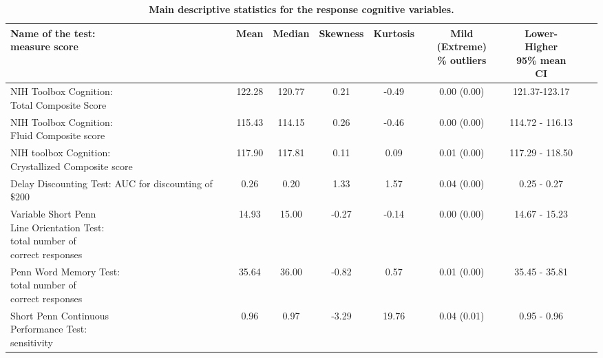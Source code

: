 \documentclass[10pt,letterpaper]{article}
\begin{document}
\begin{table}[!ht]
\begin{adjustwidth}{-2.25in}{0in} 
\centering
\caption{{\bf Main descriptive statistics for the response cognitive variables.}}
\begin{tabular}{|l|c|c|c|c|c|c|c|c|}
\hline
\makecell[l]{Name of the test:\\ measure score} &    Mean &  Median &  Skewness &  Kurtosis &    \makecell{Mild (Extreme) \\ \%  outliers} &\makecell{Lower-Higher \\ 95\% mean CI} \\
\hline
\makecell[l]{NIH Toolbox Cognition: \\ Total  Composite Score}   &  122.28 &  120.77 &      0.21 &     -0.49 &             0.00 (0.00) &  121.37-123.17 \\
\hline
\makecell[l]{NIH Toolbox Cognition: \\ Fluid  Composite score}  &  115.43 &  114.15 &      0.26 &     -0.46 &             0.00 (0.00)  &  114.72 -   116.13 \\
\hline
\makecell[l]{NIH toolbox  Cognition: \\ Crystallized Composite score} &  117.90 &  117.81 &      0.11 &      0.09 &             0.01 (0.00) &      117.29 -   118.50 \\
\hline
\makecell[l]{Delay Discounting Test:\\ AUC for discounting \\ of $\$200$ }      &    0.26 &    0.20 &      1.33 &      1.57 &             0.04 (0.00) &     0.25 - 0.27 \\
 \hline
 \makecell[l]{Variable Short Penn \\ Line  Orientation Test: \\ total number of \\ correct responses} &   14.93 &   15.00 &     -0.27 &     -0.14 &             0.00 (0.00) &    14.67 -    15.23 \\
\hline
 \makecell[l]{Penn Word Memory Test: \\ total number of \\ correct responses}             &   35.64 &   36.00 &     -0.82 &      0.57 &             0.01 (0.00) &  35.45 -    35.81 \\
 \hline
\makecell[l]{Short Penn  Continuous \\ Performance Test:\\ sensitivity}            &    0.96 &    0.97 &     -3.29 &     19.76 &             0.04 (0.01) &     0.95 -     0.96 \\
\hline
\end{tabular}
\label{table:table1}
\end{adjustwidth}
\end{table}
\end{document}
